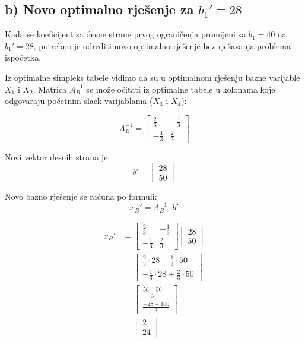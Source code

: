 \documentclass[12pt,a4paper]{article}
\begin{document}
\subsection{b) Novo optimalno rješenje za $b_1' = 28$}

Kada se koeficijent sa desne strane prvog ograničenja promijeni sa $b_1 = 40$ na $b_1' = 28$, potrebno je odrediti novo optimalno rješenje bez rješavanja problema ispočetka.

Iz optimalne simpleks tabele vidimo da su u optimalnom rješenju bazne varijable $X_1$ i $X_2$. Matrica $A_B^{-1}$ se može očitati iz optimalne tabele u kolonama koje odgovaraju početnim slack varijablama ($X_3$ i $X_4$):

\begin{equation}
A_B^{-1} = \begin{bmatrix}
\frac{2}{3} & -\frac{1}{3} \\
-\frac{1}{3} & \frac{2}{3}
\end{bmatrix}
\end{equation}

Novi vektor desnih strana je:
\begin{equation}
b' = \begin{bmatrix} 28 \\ 50 \end{bmatrix}
\end{equation}

Novo bazno rješenje se računa po formuli:
\begin{equation}
x_B' = A_B^{-1} \cdot b'
\end{equation}

\begin{align}
x_B' &= \begin{bmatrix}
\frac{2}{3} & -\frac{1}{3} \\
-\frac{1}{3} & \frac{2}{3}
\end{bmatrix} \begin{bmatrix} 28 \\ 50 \end{bmatrix} \\
&= \begin{bmatrix}
\frac{2}{3} \cdot 28 - \frac{1}{3} \cdot 50 \\
-\frac{1}{3} \cdot 28 + \frac{2}{3} \cdot 50
\end{bmatrix} \\
&= \begin{bmatrix}
\frac{56 - 50}{3} \\
\frac{-28 + 100}{3}
\end{bmatrix} \\
&= \begin{bmatrix} 2 \\ 24 \end{bmatrix}
\end{align}
\end{document}
